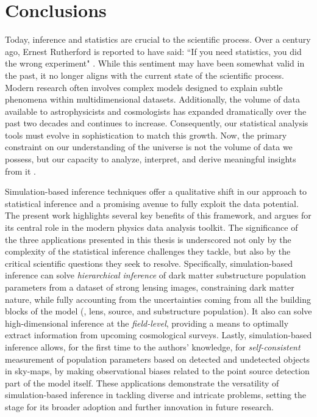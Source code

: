 \chapter{Conclusions} \label{cha:conclusions}

Today, inference and statistics are crucial to the scientific process. Over a century ago, Ernest Rutherford is reported to have said: ``If you need statistics, you did the wrong experiment" \cite{Blackett}. While this sentiment may have been somewhat valid in the past, it no longer aligns with the current state of the scientific process. Modern research often involves complex models designed to explain subtle phenomena within multidimensional datasets. Additionally, the volume of data available to astrophysicists and cosmologists has expanded dramatically over the past two decades and continues to increase. Consequently, our statistical analysis tools must evolve in sophistication to match this growth. Now, the primary constraint on our understanding of the universe is not the volume of data we possess, but our capacity to analyze, interpret, and derive meaningful insights from it \cite{Trotta:2017wnx}.

Simulation-based inference techniques offer a qualitative shift in our approach to statistical inference and a promising avenue to fully exploit the data potential. The present work highlights several key benefits of this framework, and argues for its central role in the modern physics data analysis toolkit. 
The significance of the three applications presented in this thesis is underscored not only by the complexity of the statistical inference challenges they tackle, but also by the critical scientific questions they seek to resolve. 
Specifically, simulation-based inference can solve \emph{hierarchical inference} of dark matter substructure population parameters from a dataset of strong lensing images, constraining dark matter nature, while fully accounting from the uncertainties coming from all the building blocks of the model (\ie, lens, source, and substructure population). It also can solve high-dimensional inference at the \emph{field-level}, providing a means to optimally extract information from upcoming cosmological surveys. Lastly, simulation-based inference allows, for the first time to the authors' knowledge, for \emph{self-consistent} measurement of population parameters based on detected and undetected objects in sky-maps, by making observational biases related to the point source detection part of the model itself. These applications demonstrate the versatility of simulation-based inference in tackling diverse and intricate problems, setting the stage for its broader adoption and further innovation in future research.

